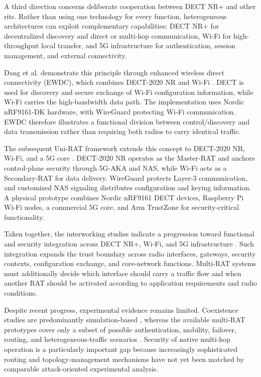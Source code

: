 A third direction concerns deliberate cooperation between DECT NR+ and other \glspl{rit}. Rather than using one technology for every function, heterogeneous architectures can exploit complementary capabilities: DECT NR+ for decentralized discovery and direct or multi-hop communication, Wi-Fi for high-throughput local transfer, and 5G infrastructure for authentication, session management, and external connectivity.

Dang et al. demonstrate this principle through enhanced wireless direct connectivity (EWDC), which combines DECT-2020 NR and Wi-Fi \cite{dangEWDCIntegratingDECT20202025a}. DECT is used for discovery and secure exchange of Wi-Fi configuration information, while Wi-Fi carries the high-bandwidth data path. The implementation uses Nordic nRF9161-DK hardware, with WireGuard protecting Wi-Fi communication. EWDC therefore illustrates a functional division between control/discovery and data transmission rather than requiring both radios to carry identical traffic.

The subsequent Uni-RAT framework extends this concept to DECT-2020 NR, Wi-Fi, and a 5G core \cite{dangUniRATUnifiedDECT20202026}. DECT-2020 NR operates as the Master-RAT and anchors control-plane security through 5G-AKA and NAS, while Wi-Fi acts as a Secondary-RAT for data delivery. WireGuard protects Layer-3 communication, and customized NAS signaling distributes configuration and keying information. A physical prototype combines Nordic nRF9161 DECT devices, Raspberry Pi Wi-Fi nodes, a commercial 5G core, and Arm TrustZone for security-critical functionality.

Taken together, the interworking studies indicate a progression toward functional and security integration across DECT NR+, Wi-Fi, and 5G infrastructure \cite{dangEWDCIntegratingDECT20202025a, dangUniRATUnifiedDECT20202026}. Such integration expands the trust boundary across radio interfaces, gateways, security contexts, configuration exchange, and core-network functions. Multi-RAT systems must additionally decide which interface should carry a traffic flow and when another RAT should be activated according to application requirements and radio conditions.

Despite recent progress, experimental evidence remains limited. Coexistence studies are predominantly simulation-based \cite{samuylovPerformanceAssessmentDECT20202023, samuylovPerformanceDECT2020NR2025}, whereas the available multi-RAT prototypes cover only a subset of possible authentication, mobility, failover, routing, and heterogeneous-traffic scenarios \cite{dangEWDCIntegratingDECT20202025a, dangUniRATUnifiedDECT20202026}. Security of native multi-hop operation is a particularly important gap because increasingly sophisticated routing and topology-management mechanisms have not yet been matched by comparable attack-oriented experimental analysis.

